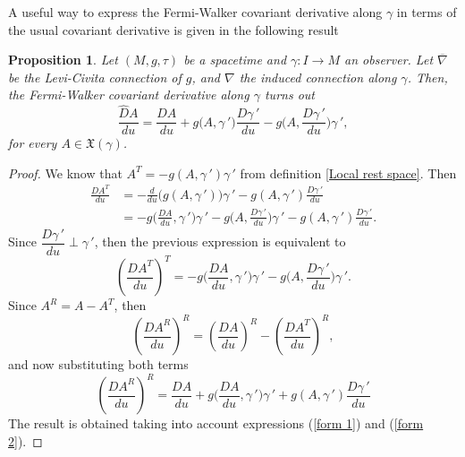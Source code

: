 \documentclass[11pt]{book}
\newtheorem{pro}[defi]{Proposition}
\def\x{\mathfrak X}
\begin{document}
A useful way to express the Fermi-Walker covariant derivative along $\gamma$ in terms of the usual covariant derivative is given in the following result
\begin{pro}\label{prop der cov FM}
	Let $(M,g,\tau)$ be a spacetime and $\gamma:I\to M$ an observer. Let $\overline{\nabla}$ be the Levi-Civita connection of $g$, and $\nabla$ the induced connection along $\gamma$. Then, the Fermi-Walker covariant derivative along $\gamma$ turns out
	\begin{equation}\label{der cov FM}
		\frac{\widehat{D}A}{du}=\frac{DA}{du}+g\big(A,\gamma{\,'}\big)\frac{D\gamma{\,'}}{du}-g\Big(A,\frac{D\gamma{\,'}}{du}\Big)\gamma{\,'},
	\end{equation}
	for every $A\in \x(\gamma)$.
\end{pro}
\begin{proof}
	We know that $A^T=-g(A,\gamma{\,'})\gamma{\,'}$ from definition \ref{Local rest space}. Then
	\begin{align*}
		\frac{DA^T}{du} & =-\frac{d}{du}\big(g(A,\gamma{\,'})\big)\gamma{\,'} - g(A,\gamma{\,'})\frac{D\gamma{\,'}}{du} \\[2mm]
		& =-g\Big(\frac{DA}{du},\gamma{\,'}\Big)\gamma{\,'} -g\Big(A,\frac{D\gamma{\,'}}{du}\Big)\gamma{\,'}-g(A,\gamma{\,'})\frac{D\gamma{\,'}}{du}.
	\end{align*}
	Since $\dfrac{D\gamma{\,'}}{du}\perp \gamma{\,'}$, then the previous expression is equivalent to
	\begin{equation}\label{form 1}
		\left(\frac{DA^T}{du}\right)^T=-g\Big(\frac{DA}{du},\gamma{\,'}\Big)\gamma{\,'}-g\Big(A,\frac{D\gamma{\,'}}{du}\Big)\gamma{\,'}.
	\end{equation}
	Since $A^R=A-A^T$, then
	\[
	\left(\frac{DA^R}{du}\right)^R=\left(\frac{DA}{du}\right)^R-\left(\frac{DA^T}{du}\right)^R,
	\]
	and now substituting both terms
	\begin{equation}\label{form 2}
		\left(\frac{DA^R}{du}\right)^R=\frac{DA}{du}+g\Big(\frac{DA}{du},\gamma{\,'}\Big)\gamma{\,'}+g(A,\gamma{\,'})\frac{D\gamma{\,'}}{du}
	\end{equation}
	The result is obtained taking into account expressions (\ref{form 1}) and (\ref{form 2}).
\end{proof}
\end{document}
